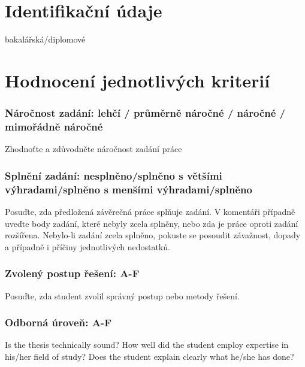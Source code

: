 \documentclass{article}
\date{}
\begin{document}
\section{Identifikační údaje}

\begin{description}[nosep]
\item[Název práce:] %
\item[Jméno autora:] %
\item[Typ práce:] bakalářská/diplomové %
\item[Fakulta/ústav:] %
\item[Jméno oponenta:] %
\item[Pracoviště oponenta:]%
\end{description}

\section{Hodnocení jednotlivých kriterií}

\subsubsection*{Náročnost zadání: {lehčí} / {průměrně náročné} / {náročné} / {mimořádně náročné}} %
Zhodnoťte a zdůvodněte náročnost zadání práce 

\subsubsection*{Splnění zadání: {nesplněno}/{splněno s většími výhradami}/{splněno s menšími výhradami}/{splněno}} %
Posuďte, zda předložená závěrečná práce splňuje zadání. V komentáři případně uveďte body zadání, které nebyly zcela splněny, nebo zda je práce oproti zadání rozšířena. Nebylo-li zadání zcela splněno, pokuste se posoudit závažnost, dopady a případně i příčiny jednotlivých nedostatků.

\subsubsection*{Zvolený postup řešení: A-F} %
Posuďte, zda student zvolil správný postup nebo metody řešení.

\subsubsection*{Odborná úroveň: A-F} %
Is the thesis technically sound? How well did the student employ expertise in his/her field of study? Does the student explain clearly what he/she has done?
\end{document}
